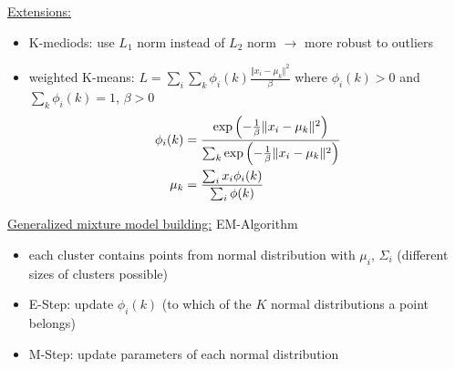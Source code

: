 \documentclass[10pt,landscape,a4paper]{article}
\begin{document}
\begin{multicols*}{4}
\underline{Extensions:}
\begin{itemize}
	\item K-mediods: use $L_1$ norm instead of $L_2$ norm $\to$ more robust to outliers
	\item weighted K-means: $L=\sum_i\sum_k \phi_i(k)\frac{\Vert x_i-\mu_k\Vert^2}{\beta}$ where $\phi_i(k)>0$ and $\sum_k \phi_i(k)=1$, $\beta>0$
	\begin{align}
		\phi_i(k) &= \frac{\exp\left(-\frac{1}{\beta}\Vert x_i-\mu_k\Vert^2\right)}{\sum_k \exp\left(-\frac{1}{\beta}\Vert x_i-\mu_k\Vert^2\right)} \notag \\
		\mu_k &= \frac{\sum_i x_i\phi_i(k)}{\sum_i \phi(k)} \notag
	\end{align}
\end{itemize}
\underline{Generalized mixture model building:} EM-Algorithm
\begin{itemize}
	\item each cluster contains points from normal distribution with $\mu_i$, $\Sigma_i$ (different sizes of clusters possible)
	\item E-Step: update $\phi_i(k)$ (to which of the $K$ normal distributions a point belongs)
	\item M-Step: update parameters of each normal distribution
\end{itemize}


\end{multicols*}
\end{document}
